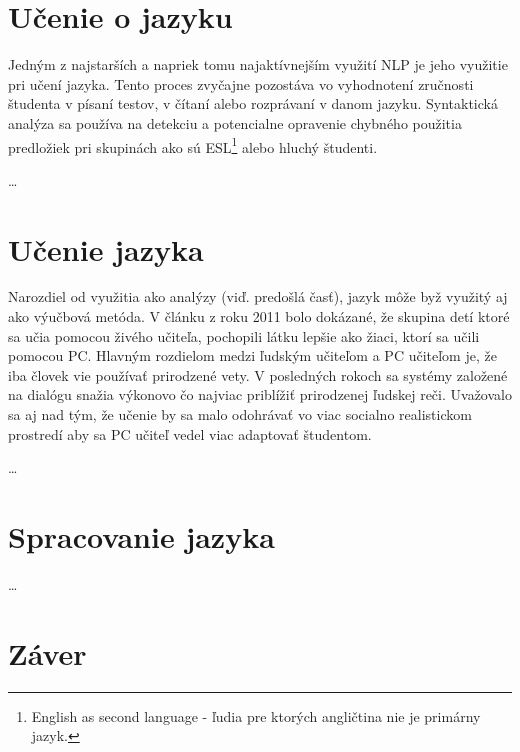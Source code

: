 \documentclass[10pt,twoside,slovak,a4paper]{article}
\begin{document}
\section{Učenie o jazyku} \label{ucenie_jazyka}
Jedným z najstarších a napriek tomu najaktívnejším využití NLP je jeho využitie pri učení jazyka.
Tento proces zvyčajne pozostáva vo vyhodnotení zručnosti študenta v písaní testov, v čítaní alebo
rozprávaní v danom jazyku. Syntaktická analýza sa používa na detekciu a potencialne opravenie chybného použitia
predložiek pri skupinách ako sú ESL\footnote{English as second language - ľudia pre ktorých angličtina nie je primárny jazyk.} alebo hluchý študenti.

\ldots

\section{Učenie jazyka} \label{ucenie_pomocou_nlp}
Narozdiel od využitia ako analýzy (viď. predošlá časť), jazyk môže byž využitý aj ako výučbová metóda.
V článku z roku 2011\cite{clanok_o_studovani} bolo dokázané, že skupina detí ktoré sa učia pomocou živého učiteľa, 
pochopili látku lepšie ako žiaci, ktorí sa učili pomocou PC. Hlavným rozdielom medzi ľudským učiteľom a PC učiteľom 
je, že iba človek vie používať prirodzené vety. V posledných rokoch sa systémy založené na dialógu snažia výkonovo čo najviac
priblížiť prirodzenej ľudskej reči. Uvažovalo sa aj nad tým, že učenie by sa malo odohrávať vo viac socialno 
realistickom prostredí aby sa PC učiteľ vedel viac adaptovať študentom.


\ldots

\section{Spracovanie jazyka} \label{spracovanie_jazyka}

\ldots


\section{Záver} \label{zaver} %




 
\end{document}
